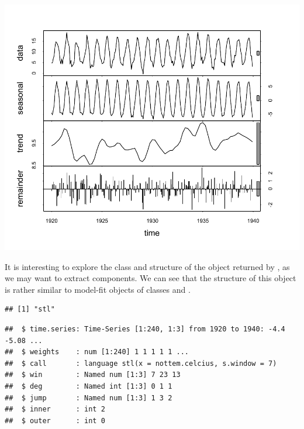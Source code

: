\documentclass[krantz2]{krantz}\usepackage{knitr}
\begin{document}
\begin{knitrout}\footnotesize
{}\color{fgcolor}\begin{kframe}
\begin{alltt}
 \hlkwb{<-}   \hlstd{=} \hlstd{)}
\end{alltt}
\end{kframe}

{\centering \includegraphics[width=.7\textwidth]{figure/pos-ts-05-1} 

}


\end{knitrout}

It is interesting to explore the class and structure of the object returned by , as we may want to extract components. We can see that the structure of this object is rather similar to model-fit objects of classes  and .

\begin{knitrout}\footnotesize
{}\color{fgcolor}\begin{kframe}
\begin{alltt}
\end{alltt}
\begin{verbatim}
## [1] "stl"
\end{verbatim}
\begin{alltt}
  \hlstd{=} \hlstd{,}  \hlstd{=} \hlstd{,}  \hlstd{=} \hlstd{)}
\end{alltt}
\begin{verbatim}
##  $ time.series: Time-Series [1:240, 1:3] from 1920 to 1940: -4.4 -5.08 ...
##  $ weights    : num [1:240] 1 1 1 1 1 ...
##  $ call       : language stl(x = nottem.celcius, s.window = 7)
##  $ win        : Named num [1:3] 7 23 13
##  $ deg        : Named int [1:3] 0 1 1
##  $ jump       : Named num [1:3] 1 3 2
##  $ inner      : int 2
##  $ outer      : int 0
\end{verbatim}
\end{kframe}
\end{knitrout}
\end{document}
